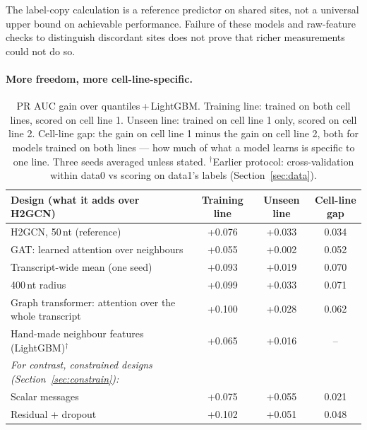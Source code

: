 \documentclass[11pt,a4paper]{article}
\begin{document}
The label-copy calculation is a reference predictor on shared sites, not a universal upper bound on achievable performance. Failure of these models and raw-feature checks to distinguish discordant sites does not prove that richer measurements could not do so.


\paragraph{More freedom, more cell-line-specific.}
\begin{table}[H]
    \centering\small
    \begin{tabularx}{\linewidth}{Yccc}
        \toprule
        \textbf{Design (what it adds over H2GCN)} & \textbf{Training line} & \textbf{Unseen line} & \textbf{Cell-line gap} \\
        \midrule
        H2GCN, 50\,nt (reference) & +0.076 & +0.033 & 0.034 \\
        \midrule
        GAT: learned attention over neighbours & +0.055 & +0.002 & 0.052 \\
        Transcript-wide mean (one seed) & +0.093 & +0.019 & 0.070 \\
        400\,nt radius & +0.099 & +0.033 & 0.071 \\
        Graph transformer: attention over the whole transcript & +0.100 & +0.028 & 0.062 \\
        Hand-made neighbour features (LightGBM)$^\dagger$ & +0.065 & +0.016 & -- \\
        \midrule
        \emph{For contrast, constrained designs (Section~\ref{sec:constrain}):} & & & \\
        Scalar messages & +0.075 & +0.055 & 0.021 \\
        Residual + dropout & +0.102 & +0.051 & 0.048 \\
        \bottomrule
    \end{tabularx}
    \caption{PR AUC gain over quantiles\,+\,LightGBM. Training line: trained
    on both cell lines, scored on cell line 1. Unseen line: trained on cell
    line 1 only, scored on cell line 2. Cell-line gap: the gain on cell line
    1 minus the gain on cell line 2, both for models trained on both lines ---
    how much of what a model learns is specific to one line. Three seeds
    averaged unless stated. $^\dagger$Earlier protocol: cross-validation
    within data0 vs scoring on data1's labels (Section~\ref{sec:data}).}
    \label{tab:capacity}
\end{table}
\end{document}
